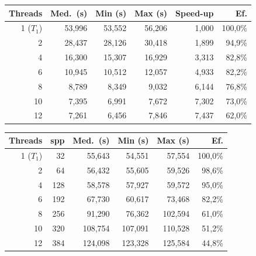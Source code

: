 \documentclass[10pt,a4paper]{article}
\begin{document}
\vspace{-8pt}
\setlength{\tabcolsep}{4.2pt}
\begin{center}
\footnotesize
{}
\label{tab:strong}
\begin{tabular}{r r r r r r}
  \toprule
  Threads & Med.\ (s) & Min (s) & Max (s) & Speed-up & Ef. \\
  \midrule
  1 ($T_1$) & 53{,}996 & 53{,}552 & 56{,}206 & 1{,}000 & 100{,}0\% \\
  2  & 28{,}437 & 28{,}126 & 30{,}418 & 1{,}899 & 94{,}9\% \\
  4  & 16{,}300 & 15{,}307 & 16{,}929 & 3{,}313 & 82{,}8\% \\
  6  & 10{,}945 & 10{,}512 & 12{,}057 & 4{,}933 & 82{,}2\% \\
  8  &  8{,}789 &  8{,}349 &  9{,}032 & 6{,}144 & 76{,}8\% \\
  10 &  7{,}395 &  6{,}991 &  7{,}672 & 7{,}302 & 73{,}0\% \\
  12 &  7{,}261 &  6{,}456 &  7{,}846 & 7{,}437 & 62{,}0\% \\
  \bottomrule
\end{tabular}

\vspace{5pt}
\label{tab:weak}
\begin{tabular}{r r r r r r}
  \toprule
  Threads & spp & Med.\ (s) & Min (s) & Max (s) & Ef. \\
  \midrule
  1 ($T_1$) &  32 & 55{,}643 & 54{,}551 & 57{,}554 & 100{,}0\% \\
  2  &  64 & 56{,}432 & 55{,}605 & 59{,}526 & 98{,}6\% \\
  4  & 128 & 58{,}578 & 57{,}927 & 59{,}572 & 95{,}0\% \\
  6  & 192 & 67{,}730 & 60{,}617 & 73{,}468 & 82{,}2\% \\
  8  & 256 & 91{,}290 & 76{,}362 & 102{,}594 & 61{,}0\% \\
  10 & 320 & 108{,}754 & 107{,}091 & 110{,}528 & 51{,}2\% \\
  12 & 384 & 124{,}098 & 123{,}328 & 125{,}584 & 44{,}8\% \\
  \bottomrule
\end{tabular}


\end{center}
\end{document}
